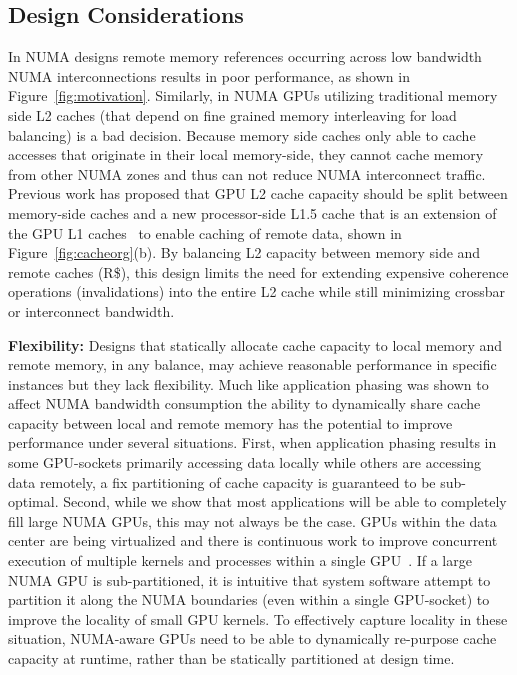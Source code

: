 \vspace{-0.1in}
\subsection{Design Considerations}
In NUMA designs remote memory references occurring across low bandwidth NUMA 
interconnections results in poor performance, as shown in 
Figure~\ref{fig:motivation}. Similarly, in NUMA GPUs utilizing
traditional memory side L2 caches (that depend on fine grained memory 
interleaving for load balancing) is a bad decision. Because memory side caches only
able to cache accesses that originate in their local memory-side, they cannot
cache memory from other NUMA zones and thus can not reduce NUMA interconnect traffic.  
Previous work has proposed that GPU L2 cache capacity should be split between 
memory-side caches and a new processor-side L1.5 cache that is an extension 
of the GPU L1 caches~\cite{Arunkumar2017} to enable caching of remote data, shown
in Figure~\ref{fig:cacheorg}(b). By balancing L2 capacity between memory side 
and remote caches (R\$), this design limits the need for extending expensive coherence
operations (invalidations) into the entire L2 cache while still 
minimizing crossbar or interconnect bandwidth.

\textbf{Flexibility:} Designs that statically allocate cache capacity to local memory and remote memory, 
in any balance, may achieve reasonable performance in specific instances 
but they lack flexibility. Much like application phasing was shown to affect 
NUMA bandwidth consumption the ability to dynamically share cache capacity between local and 
remote memory has the potential to improve performance under several 
situations. First, when application phasing results in some GPU-sockets
primarily accessing data locally while others are accessing data remotely,
a fix partitioning of cache capacity is guaranteed to be sub-optimal.
Second, while 
we show that most applications will be able to completely fill large 
NUMA GPUs, this may not always be the case. GPUs within the data center are 
being virtualized and there is continuous work to improve concurrent execution 
of multiple kernels and processes within a single GPU~\cite{park2015chimera, lin2016enabling, puthoor2016implementing, HSATASKMODEL}. If a large NUMA GPU is sub-partitioned, it is intuitive 
that system software attempt to partition it along the NUMA boundaries (even within
a single GPU-socket) to improve the locality of small GPU kernels.
To effectively  capture locality in these situation, NUMA-aware GPUs need to be able to 
dynamically re-purpose cache capacity at runtime, rather than be statically partitioned at design time. 

